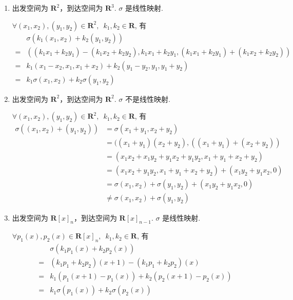 \documentclass[UTF8,12pt,a4paper,fontset=fandol]{ctexart}
\begin{document}
\begin{solve}
\begin{enumerate}
        \item 出发空间为 $ \mathbf{R}^2 $，到达空间为 $ \mathbf{R}^3 $. $ \sigma $ 是线性映射.

              $ \forall (x_1, x_2), (y_1, y_2) \in \mathbf{R}^2,\enspace k_1, k_2 \in \mathbf{R} $, 有
              \begin{align*}
                      & \sigma(k_1(x_1, x_2) + k_2(y_1, y_2))                                                                     \\
                  ={} & ((k_1 x_1 + k_2 y_1) - (k_1 x_2 + k_2 y_2), k_1 x_1 + k_2 y_1, (k_1 x_1 + k_2 y_1) + (k_1 x_2 + k_2 y_2)) \\
                  ={} & k_1(x_1 - x_2, x_1, x_1 + x_2) + k_2(y_1 - y_2, y_1, y_1 + y_2)                                           \\
                  ={} & k_1 \sigma(x_1, x_2) + k_2 \sigma(y_1, y_2)
              \end{align*}

        \item 出发空间为 $ \mathbf{R}^2 $，到达空间为 $ \mathbf{R}^2 $. $ \sigma $ 不是线性映射.

              $ \forall (x_1, x_2), (y_1, y_2) \in \mathbf{R}^2,\enspace k_1, k_2 \in \mathbf{R} $, 有
              \begin{align*}
                  \sigma((x_1, x_2) + (y_1, y_2))
                   & = \sigma(x_1 + y_1, x_2 + y_2)                                        \\
                   & = ((x_1 + y_1)(x_2 + y_2), ((x_1 + y_1) + (x_2 + y_2))                \\
                   & = (x_1 x_2 + x_1 y_2 + y_1 x_2 + y_1 y_2, x_1 + y_1 + x_2 + y_2)      \\
                   & = (x_1 x_2 + y_1 y_2, x_1 + y_1 + x_2 + y_2) + (x_1 y_2 + y_1 x_2, 0) \\
                   & = \sigma(x_1, x_2) + \sigma(y_1, y_2) + (x_1 y_2 + y_1 x_2, 0)        \\
                   & \neq \sigma(x_1, x_2) + \sigma(y_1, y_2)
              \end{align*}

        \item 出发空间为 $ \mathbf{R}[x]_n $，到达空间为 $ \mathbf{R}[x]_{n - 1} $. $ \sigma $ 是线性映射.

              $ \forall p_1(x), p_2(x) \in \mathbf{R}[x]_n,\enspace k_1, k_2 \in \mathbf{R} $, 有
              \begin{align*}
                      & \sigma(k_1 p_1(x) + k_2 p_2(x))                     \\
                  ={} & (k_1 p_1 + k_2 p_2)(x + 1) - (k_1 p_1 + k_2 p_2)(x) \\
                  ={} & k_1(p_1(x + 1) - p_1(x)) + k_2(p_2(x + 1) - p_2(x)) \\
                  ={} & k_1 \sigma(p_1(x)) + k_2 \sigma(p_2(x))
              \end{align*}


\end{enumerate}
\end{solve}
\end{document}
